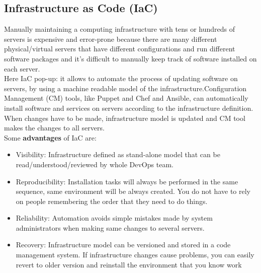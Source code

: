 \documentclass[10pt,a4paper]{report}
\begin{document}
\subsection{Infrastructure as Code (IaC)}
Manually maintaining a computing infrastructure with tens or hundreds of servers is expensive and error-prone because there are many different physical/virtual servers that have different configurations and run different software packages and it's difficult to manually keep track of software installed on each server.\\
Here IaC pop-up: it allows to automate the process of updating software on servers, by using a machine readable
model of the infrastructure.Configuration Management (CM) tools, like Puppet and Chef and Ansible, can automatically install software and services on servers according to the infrastructure definition.
When changes have to be made, infrastructure model is updated and CM tool makes the changes to all servers.\\
Some \textbf{advantages} of IaC are:
\begin{itemize}
	\item Visibility: Infrastructure defined as stand-alone model that can be
	read/understood/reviewed by whole DevOps team.
	\item Reproducibility: Installation tasks will always be performed in the same sequence, same
	environment will be always created. You do not have to rely on people
	remembering the order that they need to do things.
	\item Reliability: Automation avoids simple mistakes made by system administrators when
	making same changes to several servers.
	\item Recovery: Infrastructure model can be versioned and stored in a code management
	system. If infrastructure changes cause problems, you can easily revert
	to older version and reinstall the environment that you know work
\end{itemize}
\end{document}

